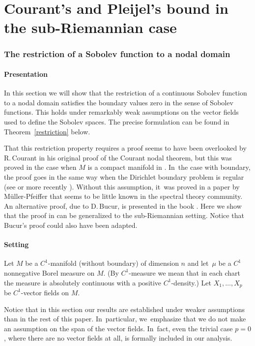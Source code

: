 \part{Courant's and Pleijel's bound in the sub-Riemannian case}

\section{The restriction of a Sobolev function to a nodal domain}\label{srest}

\subsection{Presentation}
In this section we will show that the restriction of a continuous Sobolev function to a nodal domain satisfies the boundary values zero in the sense of Sobolev functions. This holds under remarkably weak assumptions on the vector fields used to define the Sobolev spaces. The precise formulation can be found in Theorem~\ref{restriction} below.

That this restriction property requires a proof seems to have been overlooked by R.\,Courant in his original proof of the Courant nodal theorem, but this was proved in the case when $M$ is a compact manifold in \cite{BerMe}. In~the case with boundary, the proof goes in the same way when the Dirichlet boundary problem is regular (see \cite{An} or more recently \cite{LMP}). Without this assumption, it~was proved in a paper by Müller-Pfeiffer \cite{MP} that seems to be little known in the spectral theory community. An alternative proof, due to D.\,Bucur, is presented in the book \cite{LMP}. Here we show that the proof in \cite{MP} can be generalized to the sub-Riemannian setting. Notice that Bucur's proof could also have been adapted.

\subsection{Setting}\label{ss2.2}
Let $M$ be a $C^1$-manifold (without boundary) of dimension $n$ and let~$\mu$ be a $C^1$ nonnegative Borel measure on $M$. (By $C^1$-measure we mean that in each chart the measure is absolutely continuous with a positive $C^1$-density.) Let $X_1,\ldots,X_p$ be $C^1$-vector fields on $M$.

Notice that in this section our results are established under weaker assumptions than in the rest of this paper. In~particular, we~emphasize that we do not make an assumption on the span of the vector fields. In~fact, even the trivial case $p=0$, where there are no vector fields at all, is formally included in our analysis.

